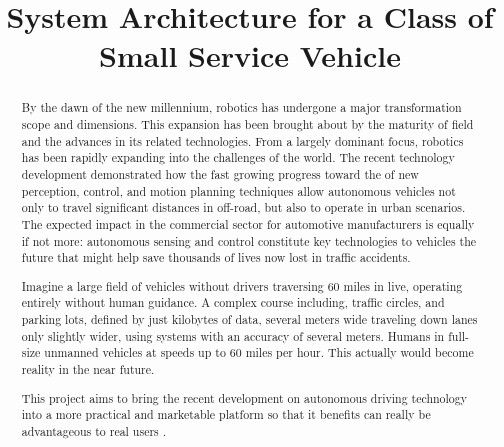 \documentclass[conference]{IEEEtran}
\begin{document}
\title{System Architecture for a Class of Small Service Vehicle}
\author{
}
\maketitle

\begin{abstract}
By the dawn of the new millennium, robotics has undergone a major transformation scope and dimensions. This expansion has been brought about by the maturity of field and the advances in its related technologies. From a largely dominant focus, robotics has been rapidly expanding into the challenges of the world. The recent technology development demonstrated how the fast growing progress toward the of new perception, control, and motion planning techniques allow autonomous vehicles not only to travel significant distances in off-road, but also to operate in urban scenarios. The expected impact in the commercial sector for automotive manufacturers is equally if not more: autonomous sensing and control constitute key technologies to vehicles the future that might help save thousands of lives now lost in traffic accidents.

Imagine a large field of vehicles without drivers traversing 60 miles in live, operating entirely without human guidance. A complex course including, traffic circles, and parking lots, defined by just kilobytes of data, several meters wide traveling down lanes only slightly wider, using systems with an accuracy of several meters. Humans in full-size unmanned vehicles at speeds up to 60 miles per hour. This actually would become reality in the near future.

This project aims to bring the recent development on autonomous driving technology into a more practical and marketable platform so that it benefits can really be advantageous to real users \cite{mrx05,IEEEexample:bluebookstandard,IEEEexample:softonline,Dellaert06ijrr}.
\end{abstract}



\end{document}

